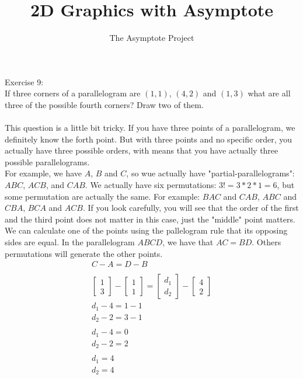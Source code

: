 \documentclass[12pt]{article}
\title{2D Graphics with Asymptote}
\author{The Asymptote Project}
\newcommand{\insertrep}[1]{%
	\hspace*{-2.4cm}
	\fbox{\texttt{[image: \#1]}}
}
\begin{document}
	Exercise 9:\\
	If three corners of a parallelogram are $(1,1)$, $(4,2)$ and $(1,3)$ what are all three of the possible fourth corners? Draw two of them.\\
	\\
	This question is a little bit tricky. If you have three points of a parallelogram, we definitely know the forth point. But with three points and no specific order, you actually have three possible orders, with means that you have actually three possible parallelograms.\\
	For example, we have $A$, $B$ and $C$, so wue actually have "partial-parallelograms": $ABC$, $ACB$, and $CAB$. We actually have six permutations: $3!=3*2*1=6$, but some permutation are actually the same. For example: $BAC$ and $CAB$, $ABC$ and $CBA$, $BCA$ and $ACB$. If you look carefully, you will see that the order of the first and the third point does not matter in this case, just the "middle" point matters.\\
	We can calculate one of the points using the pallelogram rule that its opposing sides are equal. In the parallelogram $ABCD$, we have that $AC=BD$. Others permutations will generate the other points.
	\begin{align*}
		C-A=D-B\\
		\\
		\begin{bmatrix}1\\3\end{bmatrix}-\begin{bmatrix}1\\1\end{bmatrix} = \begin{bmatrix}d_1\\d_2\end{bmatrix}-\begin{bmatrix}4\\2\end{bmatrix}\\
		d_1 - 4 = 1 - 1\\
		d_2 - 2 = 3 - 1\\
		\\
		d_1 - 4 = 0\\
		d_2 - 2 = 2\\
		\\
		d_1 = 4\\
		d_2 = 4\\
	\end{align*}
	\begin{landscape}
		\begin{center}
			\insertrep{exercise01009.pdf}
		\end{center}
	\end{landscape}
\end{document}
